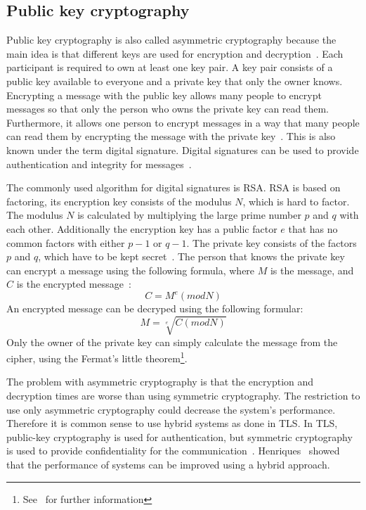 \subsection{Public key cryptography}
Public key cryptography is also called asymmetric cryptography because the main idea is that different keys are used for encryption and decryption~\cite{anderson2020security}.
Each participant is required to own at least one key pair.
A key pair consists of a public key available to everyone and a private key that only the owner knows.
Encrypting a message with the public key allows many people to encrypt messages so that only the person who owns the private key can read them.
Furthermore, it allows one person to encrypt messages in a way that many people can read them by encrypting the message with the private key~\cite{henriques2017using}.
This is also known under the term digital signature. 
Digital signatures can be used to provide authentication and integrity for messages~\cite{anderson2020security}.

The commonly used algorithm for digital signatures is RSA.
RSA is based on factoring, its encryption key consists of the modulus $N$, which is hard to factor.
The modulus $N$ is calculated by multiplying the large prime number $p$ and $q$ with each other.
Additionally the encryption key has a public factor $e$ that has no common factors with either $p-1$ or $q-1$.
The private key consists of the factors $p$ and $q$, which have to be kept secret~\cite{anderson2020security}.
The person that knows the private key can encrypt a message using the following formula, where $M$ is the message, and $C$ is the encrypted message~\cite{anderson2020security}:
\begin{displaymath}
	C = M^e (mod N)
\end{displaymath}
An encrypted message can be decryped using the following formular:
\begin{displaymath}
	M = \sqrt[e]{C (mod N)}
\end{displaymath}
Only the owner of the private key can simply calculate the message from the cipher, using the Fermat's little theorem\footnote{See~\cite{fermatlittle} for further information}.

The problem with asymmetric cryptography is that the encryption and decryption times are worse than using symmetric cryptography.
The restriction to use only asymmetric cryptography could decrease the system's performance.
Therefore it is common sense to use hybrid systems as done in TLS.
In TLS, public-key cryptography is used for authentication, but symmetric cryptography is used to provide confidentiality for the communication~\cite{henriques2017using}.
Henriques~\cite{henriques2017using} showed that the performance of systems can be improved using a hybrid approach.

